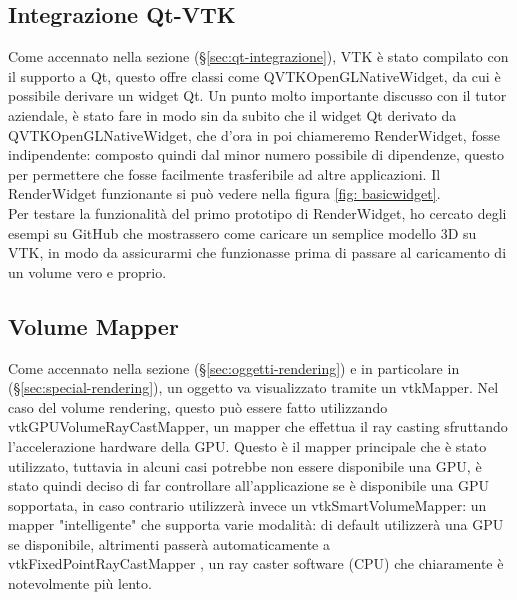\subsection{Integrazione Qt-VTK}
Come accennato nella sezione  (§\ref{sec:qt-integrazione}), VTK è stato compilato con il supporto a Qt, questo offre classi come QVTKOpenGLNativeWidget, da cui è possibile derivare un widget Qt. Un punto molto importante discusso con il tutor aziendale, è stato fare in modo sin da subito che il widget Qt derivato da QVTKOpenGLNativeWidget, che d'ora in poi chiameremo RenderWidget, fosse indipendente: composto quindi dal minor numero possibile di dipendenze, questo per permettere che fosse facilmente trasferibile ad altre applicazioni. Il RenderWidget funzionante si può vedere nella figura \ref{fig: basicwidget}.
\\
Per testare la funzionalità del primo prototipo di RenderWidget, ho cercato degli esempi su GitHub che mostrassero come caricare un semplice modello 3D su VTK, in modo da assicurarmi che funzionasse prima di passare al caricamento di un volume vero e proprio.

\subsection{Volume Mapper}
Come accennato nella sezione  (§\ref{sec:oggetti-rendering}) e in particolare in  (§\ref{sec:special-rendering}), un oggetto va visualizzato tramite un vtkMapper. Nel caso del volume rendering, questo può essere fatto utilizzando vtkGPUVolumeRayCastMapper, un mapper che effettua il ray casting sfruttando l'accelerazione hardware della GPU. Questo è il mapper principale che è stato utilizzato, tuttavia in alcuni casi potrebbe non essere disponibile una GPU, è stato quindi deciso di far controllare all'applicazione se è disponibile una GPU sopportata, in caso contrario utilizzerà invece un vtkSmartVolumeMapper: un mapper "intelligente" che supporta varie modalità: di default utilizzerà una GPU se disponibile, altrimenti passerà automaticamente a vtkFixedPointRayCastMapper , un ray caster software (CPU) che chiaramente è notevolmente più lento.

